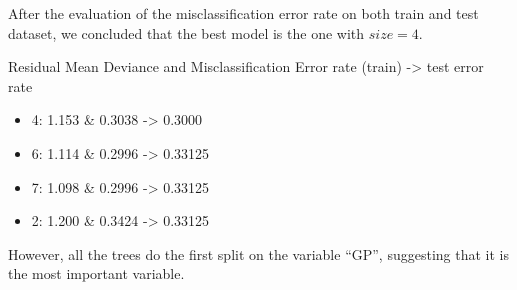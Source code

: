 After the evaluation of the misclassification error rate on both train and test dataset, we concluded that the best model is the one with $size = 4$.

Residual Mean Deviance and Misclassification Error rate (train) -> test error rate
\begin{itemize}
	\item 4: 1.153 \& 0.3038 -> 0.3000
	\item 6: 1.114 \& 0.2996 -> 0.33125
	\item 7: 1.098 \& 0.2996 -> 0.33125
	\item 2: 1.200 \& 0.3424 -> 0.33125
\end{itemize}

However, all the trees do the first split on the variable ``GP'', suggesting that it is the most important variable.
